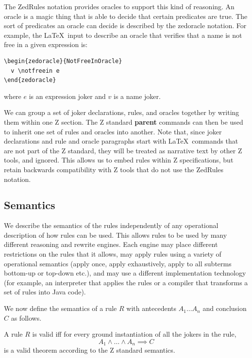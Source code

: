 \documentclass{entcs}
\begin{document}
The ZedRules notation provides oracles to support this kind of
reasoning.  An oracle is a magic thing that is able to decide that
certain predicates are true.  The sort of predicates an oracle can
decide is described by the zedoracle notation.  For example, the
\LaTeX\ input to describe an oracle that verifies that a name is not
free in a given expression is:
\begin{verbatim}
\begin{zedoracle}{NotFreeInOracle}
  v \notfreein e
\end{zedoracle}
\end{verbatim}
where $e$ is an expression joker and $v$ is a name joker.

We can group a set of joker declarations, rules, and oracles together
by writing them within one Z section.  The Z standard \textbf{parent}
commands can then be used to inherit one set of rules and oracles into
another.  Note that, since joker declarations and rule and oracle
paragraphs start with \LaTeX\ commands that are not part of the Z
standard, they will be treated as narrative text by other Z tools, and
ignored.  This allows us to embed rules within Z specifications, but
retain backwards compatibility with Z tools that do not use the
ZedRules notation.

\subsection{Semantics}

We describe the semantics of the rules independently of any operational
description of how rules can be used.  This allows rules to be used by many
different reasoning and rewrite engines.  Each engine may place different
restrictions on the rules that it allows, may apply rules using a variety
of operational semantics (apply once, apply exhaustively, apply to all
subterms bottom-up or top-down etc.), and may use a different
implementation technology (for example, an interpreter that applies the
rules or a compiler that transforms a set of rules into Java code).

We now define the semantics of a rule $R$ with antecedents $A_1
\ldots A_n$ and conclusion $C$ as follows.
\begin{defn} %
  A rule $R$ is valid iff for every ground instantiation of
  all the jokers in the rule,
  \[
       A_1 \land \ldots \land A_n \implies C
  \]
  is a valid theorem according to the Z standard semantics.
\end{defn}
\end{document}
